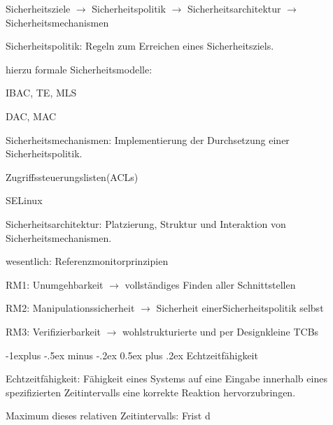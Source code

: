 \documentclass[a4paper]{article}
\makeatletter
\renewcommand{\subsection}{\@startsection{subsection}{2}{0mm}%
 {-1explus -.5ex minus -.2ex}%
 {0.5ex plus .2ex}%
 {\normalfont\normalsize\bfseries}}
\makeatother
\begin{document}
\begin{multicols}{3}
    \begin{itemize*}
        \item Sicherheitsziele $\rightarrow$ Sicherheitspolitik
        $\rightarrow$ Sicherheitsarchitektur
        $\rightarrow$ Sicherheitsmechanismen
        \item Sicherheitspolitik: Regeln zum Erreichen eines Sicherheitsziels.
        \begin{itemize*}
            \item hierzu formale Sicherheitsmodelle:
            \item IBAC, TE, MLS
            \item DAC, MAC
        \end{itemize*}
        \item Sicherheitsmechanismen: Implementierung der Durchsetzung einer
        Sicherheitspolitik.
        \begin{itemize*}
            \item Zugriffssteuerungslisten(ACLs)
            \item SELinux
        \end{itemize*}
        \item Sicherheitsarchitektur: Platzierung, Struktur und Interaktion von
        Sicherheitsmechanismen.
        \begin{itemize*}
            \item wesentlich: Referenzmonitorprinzipien
            \item RM1: Unumgehbarkeit $\rightarrow$ vollständiges Finden aller Schnittstellen
            \item RM2: Manipulationssicherheit $\rightarrow$ Sicherheit einerSicherheitspolitik selbst
            \item RM3: Verifizierbarkeit $\rightarrow$ wohlstrukturierte und per Designkleine TCBs
        \end{itemize*}
    \end{itemize*}


    \subsection{Echtzeitfähigkeit}

    \begin{itemize*}
        \item Echtzeitfähigkeit: Fähigkeit eines Systems auf eine Eingabe innerhalb
        eines spezifizierten Zeitintervalls eine korrekte Reaktion
        hervorzubringen.
        \item Maximum dieses relativen Zeitintervalls: Frist d
    \end{itemize*}


\end{multicols}
\end{document}
